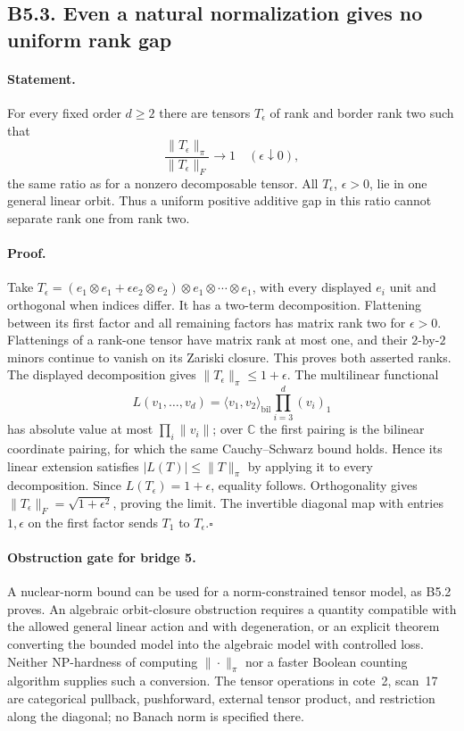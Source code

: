 \subsection*{B5.3. Even a natural normalization gives no uniform rank gap}
\paragraph{Statement.}
For every fixed order $d\geq2$ there are tensors $T_\epsilon$ of rank
and border rank two such that
\[
 \frac{\|T_\epsilon\|_\pi}{\|T_\epsilon\|_F}\longrightarrow1
 \quad(\epsilon\downarrow0),
\]
the same ratio as for a nonzero decomposable tensor.  All
$T_\epsilon$, $\epsilon>0$, lie in one general linear orbit.  Thus a
uniform positive additive gap in this ratio cannot separate rank one
from rank two.
\paragraph{Proof.}
Take
$T_\epsilon=(e_1\otimes e_1+\epsilon e_2\otimes e_2)\otimes
e_1\otimes\cdots\otimes e_1$, with every displayed $e_i$ unit and
orthogonal when indices differ.  It has a two-term decomposition.
Flattening between its first factor and all remaining factors has
matrix rank two for $\epsilon>0$.  Flattenings of a rank-one tensor
have matrix rank at most one, and their $2$-by-$2$ minors continue to
vanish on its Zariski closure.  This proves both asserted ranks.
The displayed decomposition gives
$\|T_\epsilon\|_\pi\leq1+\epsilon$.
The multilinear functional
\[
 L(v_1,\ldots,v_d)=
   \langle v_1,v_2\rangle_{\mathrm{bil}}
       \prod_{i=3}^d(v_i)_1
\]
has absolute value at most $\prod_i\|v_i\|$; over $\mathbb C$ the
first pairing is the bilinear coordinate pairing, for which the same
Cauchy--Schwarz bound holds.  Hence its linear extension satisfies
$|L(T)|\leq\|T\|_\pi$ by applying it to every decomposition.
Since $L(T_\epsilon)=1+\epsilon$, equality follows.  Orthogonality
gives $\|T_\epsilon\|_F=\sqrt{1+\epsilon^2}$, proving the limit.
The invertible diagonal map with entries $1,\epsilon$ on the first
factor sends $T_1$ to $T_\epsilon$.\hfill$\square$

\paragraph{Obstruction gate for bridge 5.}
A nuclear-norm bound can be used for a norm-constrained tensor model,
as B5.2 proves.  An algebraic orbit-closure obstruction requires a
quantity compatible with the allowed general linear action and with
degeneration, or an explicit theorem converting the bounded model into
the algebraic model with controlled loss.  Neither NP-hardness of
computing $\|\cdot\|_\pi$ nor a faster Boolean counting algorithm
supplies such a conversion.  The tensor operations in cote~2,
scan~17 are categorical pullback, pushforward, external tensor product,
and restriction along the diagonal; no Banach norm is specified there.

